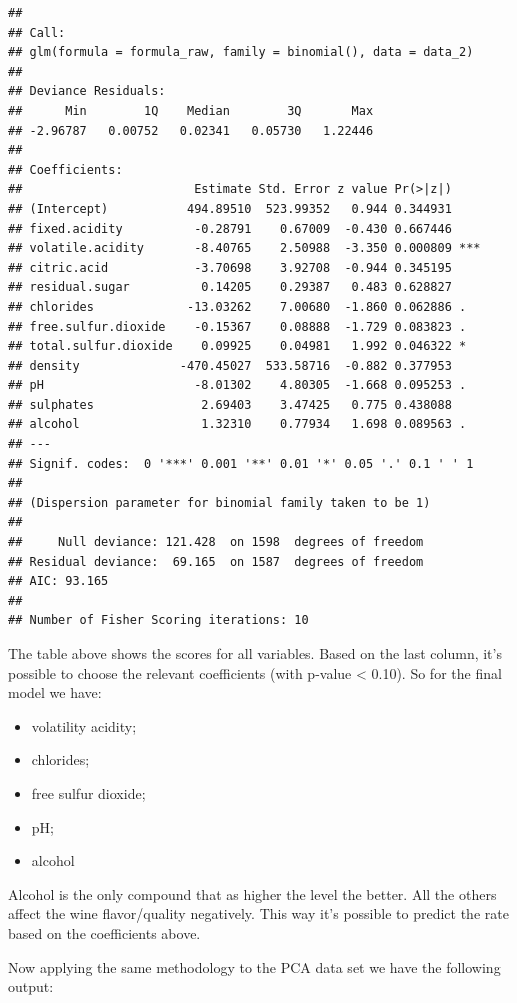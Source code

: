 \documentclass[]{article}
\begin{document}
\begin{verbatim}
## 
## Call:
## glm(formula = formula_raw, family = binomial(), data = data_2)
## 
## Deviance Residuals: 
##      Min        1Q    Median        3Q       Max  
## -2.96787   0.00752   0.02341   0.05730   1.22446  
## 
## Coefficients:
##                        Estimate Std. Error z value Pr(>|z|)    
## (Intercept)           494.89510  523.99352   0.944 0.344931    
## fixed.acidity          -0.28791    0.67009  -0.430 0.667446    
## volatile.acidity       -8.40765    2.50988  -3.350 0.000809 ***
## citric.acid            -3.70698    3.92708  -0.944 0.345195    
## residual.sugar          0.14205    0.29387   0.483 0.628827    
## chlorides             -13.03262    7.00680  -1.860 0.062886 .  
## free.sulfur.dioxide    -0.15367    0.08888  -1.729 0.083823 .  
## total.sulfur.dioxide    0.09925    0.04981   1.992 0.046322 *  
## density              -470.45027  533.58716  -0.882 0.377953    
## pH                     -8.01302    4.80305  -1.668 0.095253 .  
## sulphates               2.69403    3.47425   0.775 0.438088    
## alcohol                 1.32310    0.77934   1.698 0.089563 .  
## ---
## Signif. codes:  0 '***' 0.001 '**' 0.01 '*' 0.05 '.' 0.1 ' ' 1
## 
## (Dispersion parameter for binomial family taken to be 1)
## 
##     Null deviance: 121.428  on 1598  degrees of freedom
## Residual deviance:  69.165  on 1587  degrees of freedom
## AIC: 93.165
## 
## Number of Fisher Scoring iterations: 10
\end{verbatim}

The table above shows the scores for all variables. Based on the last
column, it's possible to choose the relevant coefficients (with p-value
\textless{} 0.10). So for the final model we have:

\begin{itemize}

\item volatility acidity;
\item chlorides;
\item free sulfur dioxide;
\item pH;
\item alcohol
 \end{itemize}

Alcohol is the only compound that as higher the level the better. All
the others affect the wine flavor/quality negatively. This way it's
possible to predict the rate based on the coefficients above.

Now applying the same methodology to the PCA data set we have the
following output:
\end{document}
